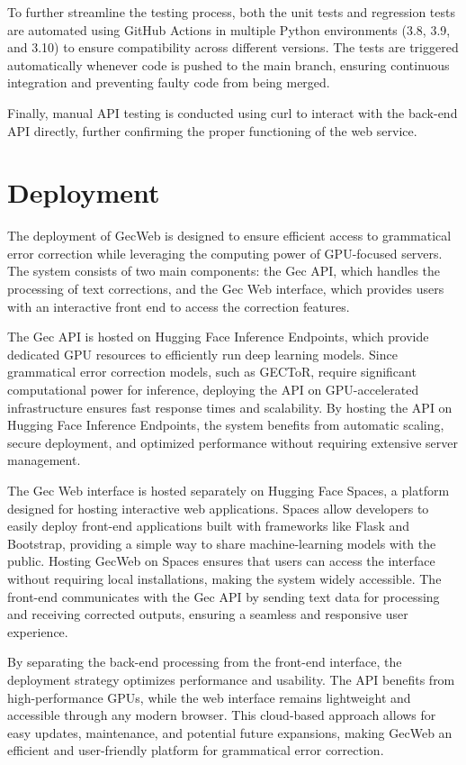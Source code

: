 To further streamline the testing process, both the unit tests and regression tests are automated using GitHub Actions in multiple Python environments (3.8, 3.9, and 3.10) to ensure compatibility across different versions.
The tests are triggered automatically whenever code is pushed to the main branch, ensuring continuous integration and preventing faulty code from being merged.

Finally, manual API testing is conducted using curl to interact with the back-end API directly, further confirming the proper functioning of the web service.

\section{Deployment}

The deployment of GecWeb is designed to ensure efficient access to grammatical error correction while leveraging the computing power of GPU-focused servers.
The system consists of two main components: the Gec API, which handles the processing of text corrections, and the Gec Web interface, which provides users with an interactive front end to access the correction features.

The Gec API is hosted on Hugging Face Inference Endpoints, which provide dedicated GPU resources to efficiently run deep learning models.
Since grammatical error correction models, such as GECToR, require significant computational power for inference, deploying the API on GPU-accelerated infrastructure ensures fast response times and scalability.
By hosting the API on Hugging Face Inference Endpoints, the system benefits from automatic scaling, secure deployment, and optimized performance without requiring extensive server management.

The Gec Web interface is hosted separately on Hugging Face Spaces, a platform designed for hosting interactive web applications.
Spaces allow developers to easily deploy front-end applications built with frameworks like Flask and Bootstrap, providing a simple way to share machine-learning models with the public.
Hosting GecWeb on Spaces ensures that users can access the interface without requiring local installations, making the system widely accessible.
The front-end communicates with the Gec API by sending text data for processing and receiving corrected outputs, ensuring a seamless and responsive user experience.

By separating the back-end processing from the front-end interface, the deployment strategy optimizes performance and usability.
The API benefits from high-performance GPUs, while the web interface remains lightweight and accessible through any modern browser.
This cloud-based approach allows for easy updates, maintenance, and potential future expansions, making GecWeb an efficient and user-friendly platform for grammatical error correction.

